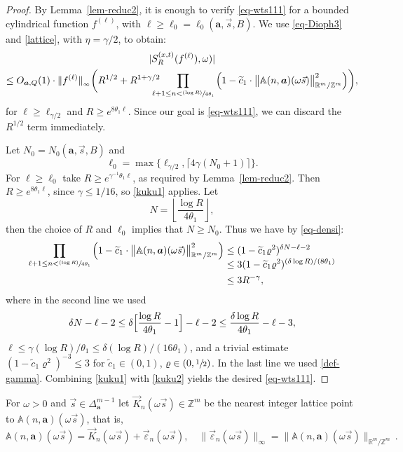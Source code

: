 \documentclass[11pt]{article}
\numberwithin{equation}{section}\newcommand{\Relation}[2][]{}\newtheorem*{prop*}{Proposition}
\newcommand\shalf{\sfrac{1}{2}}
\newcommand{\psfrac}[2]{\sfrac{(#1)}{#2}}
\theoremstyle{plain}
\theoremstyle{definition}
\let\wt\widetilde
\newcommand\bom{{\boldsymbol a}}\let\ba\bom
\let\eps\varepsilon
\let\gam\gamma
\let\om\omega
\newcommand\Aa{\mathbb{A}}
\newcommand{\R}{\mathbb{R}}
\newcommand{\Z}{\mathbb{Z}}
\newcommand\be{\begin{equation}}
\newcommand\ee{\end{equation}}
\begin{document}
\begin{proof}
By Lemma~\ref{lem-reduc2}, it is enough to verify \eqref{eq-wts111} for a bounded cylindrical function $f^{(\ell)}$, with $\ell \ge \ell_0=\ell_0(\bom,\vec s, B)$.
We use \eqref{eq-Dioph3} and \eqref{lattice}, with $\eta = \gam/2$, to obtain:
\begin{multline}
\label{kuku1}
|S^{(x,t)}_R(f^{(\ell)}),\om)|\\
\le O_{\bom,Q}(1)\cdot \|f^{(\ell)}\|_{_\infty} \biggl(R^{1/2}+ R^{1+\gam/2}\!\!\!\!\!\!\prod_{\ell+1\le n < \psfrac{\log R}{4\theta_1}}
\left( 1 - \wt c_1\cdot \bigl\|\Aa(n,\bom) (\om\vec{s})\bigr\|^2_{\R^m/\Z^m} \right)
\biggr),
\end{multline}
for $\ell\ge \ell_{\gam/2}$ and
$R\ge e^{8\theta_1\ell}$.
Since our goal is \eqref{eq-wts111},
we can discard the $R^{1/2}$ term immediately.

Let $N_0 = N_0(\bom,\vec s, B)$ and
\[
\ell_0 =\max\{ \ell_{\gam/2}, \lceil 4\gam (N_0+1)\rceil\}.
\]
For $\ell\ge \ell_0$ take $R\ge e^{\gam^{-1}\theta_1 \ell}$, as required by Lemma~\ref{lem-reduc2}. Then $R\ge e^{8\theta_1\ell}$, since $\gam\le 1/16$, so \eqref{kuku1} applies.
Let
\[
N = \left\lfloor\frac{\log R}{4\theta_1}\right\rfloor,
\]
then the choice of $R$ and $\ell_0$ implies that $N\ge N_0$. Thus we have by \eqref{eq-densi}:
\begin{equation}
\label{kuku2}
\begin{split}
\prod_{\ell+1\le n < \psfrac{\log R}{4\theta_1}}
\left( 1 - \wt c_1\cdot \bigl\|\Aa(n,\bom) (\om\vec{s})\bigr\|^2_{\R^m/\Z^m} \right)
& \le (1-\wt c_1 \varrho^2)^{\delta N-\ell-2} \\[-3.3ex]
& \le 3 (1-\wt c_1 \varrho^2)^{(\delta \log R)/(8\theta_1)} \\
& \le 3 R^{-\gam}, 
\end{split}
\end{equation}
where in the second line we used
\[
\delta N - \ell - 2 \le \delta \Bigl[\frac{\log R}{4\theta_1} - 1\Bigr] -\ell-2 \le \frac{\delta\log R}{4\theta_1} - \ell- 3,
\]
$\ell\le\gam(\log R)/\theta_1\le\delta(\log R)/(16\theta_1)$, and a trivial estimate $(1-\wt c_1 \varrho^2)^{-3}\le3$ for \hbox{$\wt c_1\in(0,1)$}, $\varrho\in (0,\shalf)$. In the last line we used \eqref{def-gamma}.
Combining \eqref{kuku1} with \eqref{kuku2} yields the desired \eqref{eq-wts111}.
\end{proof}

For $\om >0$ and $\vec s\in \Delta_\bom^{m-1}$ let $\vec K_n(\om\vec s)\in \Z^m$ be the nearest integer lattice point to $\Aa(n,\bom) (\om\vec{s})$, that is,
\be \label{def-eps}
\Aa(n,\bom) (\om\vec{s}) = \vec{K}_n(\om\vec s) + \vec{\eps}_n(\om\vec s),\quad \|\vec{\eps}_n(\om\vec s)\|_\infty = \bigl\|\Aa(n,\bom) (\om\vec{s})\bigr\|_{\R^m/\Z^m}\,.
\ee
\end{document}
